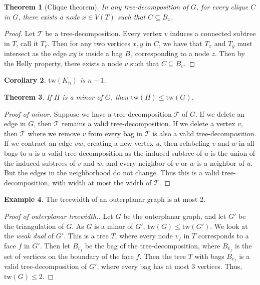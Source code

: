 \documentclass[]{article}
\newcommand{\tree}{\mathcal{T}}
\newcommand{\tw}{\text{tw}}
\newtheorem{theorem}{Theorem}
\newtheorem{corollary}[theorem]{Corollary}
\theoremstyle{definition}
\newtheorem{example}[theorem]{Example}
\numberwithin{theorem}{section}
\numberwithin{equation}{section}
\begin{document}
\begin{theorem}[Clique theorem]
	In any tree-decomposition of $G$, for every clique $C$ in $G$, there exists a node $x \in V(T)$ such that $C \subseteq B_x$. 
\end{theorem}

\begin{proof}
	Let $\tree$ be a tree-decomposition. Every vertex $v$ induces a connected subtree in $T$, call it $T_v$. Then for any two vertices $x, y$ in $C$, we have that $T_x$ and $T_y$ must intersect as the edge $xy$ is inside a bag $B_z$ corresponding to a node $z$. Then by the Helly property, there exists a node $v$ such that $C \subseteq B_v$.
\end{proof}

\begin{corollary}
	$\tw(K_n)$ is $n-1$. 
\end{corollary}

\begin{theorem}
	If $H$ is a minor of $G$, then $\tw(H) \leq \tw(G)$. 
\end{theorem}
\begin{proof}[Proof of minor]
	Suppose we have a tree-decomposition $\tree$ of $G$. If we delete an edge in $G$, then $\tree$ remains a valid tree-decomposition. If we delete a vertex $v$, then $\tree$ where we remove $v$ from every bag in $\tree$ is also a valid tree-decomposition. If we contract an edge $vw$, creating a new vertex $u$, then relabeling $v$ and $w$ in all bags to $u$ is a valid tree-decomposition as the induced subtree of $u$ is the union of the induced subtrees of $v$ and $w$, and every neighbor of $v$ or $w$ is a neighbor of $u$. But the edges in the neighborhood do not change. Thus this is a valid tree-decomposition, with width at most the width of $\tree$.
\end{proof}

\begin{example}
	The treewidth of an outerplanar graph is at most 2.
\end{example}
\begin{proof}[Proof of outerplanar treewidth.]
	Let $G$ be the outerplanar graph, and let $G'$ be the triangulation of $G$. As $G$ is a minor of $G'$, $\tw(G) \leq \tw(G')$. We look at the \textit{weak dual} of $G'$. This is a tree $T$, where every node $v_f$ in $T$ corresponds to a face $f$ in $G'$. Then let $B_{v_f}$ be the bag of the tree-decomposition, where $B_{v_f}$ is the set of vertices on the boundary of the face $f$. Then the tree $T$ with bags $B_{v_f}$ is a valid tree-decomposition of $G'$, where every bag has at most 3 vertices. Thus, $\tw(G) \leq 2$. 
\end{proof}
\end{document}
